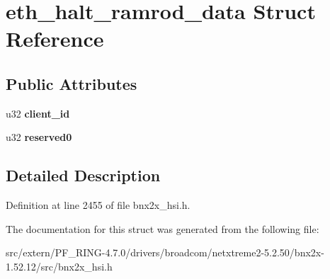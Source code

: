 \hypertarget{structeth__halt__ramrod__data}{
\section{eth\_\-halt\_\-ramrod\_\-data Struct Reference}
\label{structeth__halt__ramrod__data}
}
\subsection*{Public Attributes}
\begin{DoxyCompactItemize}
\item 
\hypertarget{structeth__halt__ramrod__data_a788f400ced94c5f5aa4d4b4617142ba3}{
u32 {\bfseries client\_\-id}}
\label{structeth__halt__ramrod__data_a788f400ced94c5f5aa4d4b4617142ba3}

\item 
\hypertarget{structeth__halt__ramrod__data_ac537ef331ec3165b74cd21531c301c8a}{
u32 {\bfseries reserved0}}
\label{structeth__halt__ramrod__data_ac537ef331ec3165b74cd21531c301c8a}

\end{DoxyCompactItemize}


\subsection{Detailed Description}


Definition at line 2455 of file bnx2x\_\-hsi.h.



The documentation for this struct was generated from the following file:\begin{DoxyCompactItemize}
\item 
src/extern/PF\_\-RING-\/4.7.0/drivers/broadcom/netxtreme2-\/5.2.50/bnx2x-\/1.52.12/src/bnx2x\_\-hsi.h\end{DoxyCompactItemize}
